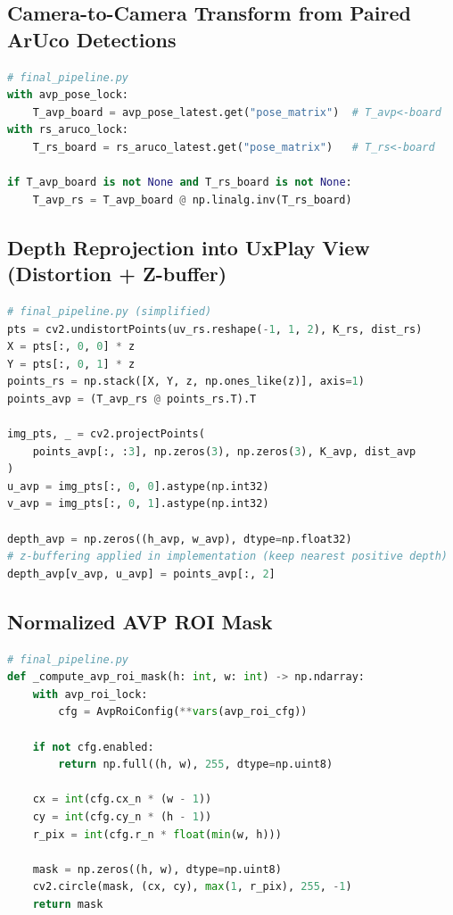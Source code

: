 \subsection{Camera-to-Camera Transform from Paired ArUco Detections}

\begin{lstlisting}[style=code,language=Python,caption={Camera-to-camera transform from simultaneous ArUco detections.},label={lst:aruco_Tavprs}]
# final_pipeline.py
with avp_pose_lock:
    T_avp_board = avp_pose_latest.get("pose_matrix")  # T_avp<-board
with rs_aruco_lock:
    T_rs_board = rs_aruco_latest.get("pose_matrix")   # T_rs<-board

if T_avp_board is not None and T_rs_board is not None:
    T_avp_rs = T_avp_board @ np.linalg.inv(T_rs_board)
\end{lstlisting}

\subsection{Depth Reprojection into UxPlay View (Distortion + Z-buffer)}

\begin{lstlisting}[style=code,language=Python,caption={Reproject aligned RS depth into the AVP/UxPlay view with distortion and z-buffering.},label={lst:depth_to_avp}]
# final_pipeline.py (simplified)
pts = cv2.undistortPoints(uv_rs.reshape(-1, 1, 2), K_rs, dist_rs)
X = pts[:, 0, 0] * z
Y = pts[:, 0, 1] * z
points_rs = np.stack([X, Y, z, np.ones_like(z)], axis=1)
points_avp = (T_avp_rs @ points_rs.T).T

img_pts, _ = cv2.projectPoints(
    points_avp[:, :3], np.zeros(3), np.zeros(3), K_avp, dist_avp
)
u_avp = img_pts[:, 0, 0].astype(np.int32)
v_avp = img_pts[:, 0, 1].astype(np.int32)

depth_avp = np.zeros((h_avp, w_avp), dtype=np.float32)
# z-buffering applied in implementation (keep nearest positive depth)
depth_avp[v_avp, u_avp] = points_avp[:, 2]
\end{lstlisting}

\subsection{Normalized AVP ROI Mask}

\begin{lstlisting}[style=code,language=Python,caption={Normalized circular ROI mask for the UxPlay view.},label={lst:avp_roi_mask}]
# final_pipeline.py
def _compute_avp_roi_mask(h: int, w: int) -> np.ndarray:
    with avp_roi_lock:
        cfg = AvpRoiConfig(**vars(avp_roi_cfg))

    if not cfg.enabled:
        return np.full((h, w), 255, dtype=np.uint8)

    cx = int(cfg.cx_n * (w - 1))
    cy = int(cfg.cy_n * (h - 1))
    r_pix = int(cfg.r_n * float(min(w, h)))

    mask = np.zeros((h, w), dtype=np.uint8)
    cv2.circle(mask, (cx, cy), max(1, r_pix), 255, -1)
    return mask
\end{lstlisting}

